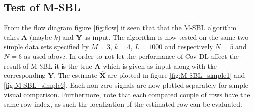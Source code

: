 \subsection{Test of M-SBL}
From the flow diagram figure \ref{fig:flow} it seen that that the M-SBL algorithm takes $\mathbf{A}$ (maybe $k$) and $\mathbf{Y}$ as input. The algorithm is now tested on the same two simple data sets specified by $M = 3$, $k = 4$, $L=1000$ and respectively $N = 5$ and $N = 8$ as used above. 
In order to not let the performance of Cov-DL affect the result of M-SBL it is the true $\mathbf{A}$ which is given as input along with the corresponding $\mathbf{Y}$. The estimate $\hat{\mathbf{X}}$ are plotted in figure \ref{fig:M-SBL_simple1} and \ref{fig:M-SBL_simple2}. Each non-zero signals are now plotted separately for simple visual comparison. Furthermore, note that each compared couple of rows have the same row index, as such the localization of the estimated row can be evaluated.
